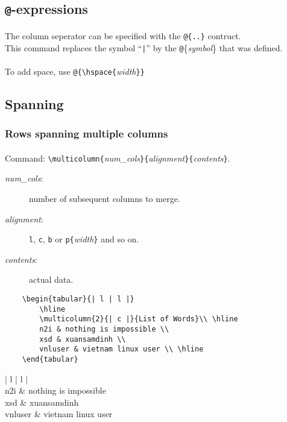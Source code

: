 \documentclass[11pt,a4paper]{article}
\begin{document}
\subsection{\texttt{@}-expressions}
\paragraph{}
The column seperator can be specified with the \verb|@{..}| contruct.\\
This command replaces the symbol ``\verb:|:'' by the \texttt{@}\{\emph{symbol}\} that was defined.

\paragraph{}
To add space, use \verb|@{\hspace{|\emph{width}\verb|}}|%



\subsection{Spanning}
\subsubsection{Rows spanning multiple columns}
\paragraph{}
Command: \verb|\multicolumn{|\emph{num\_cols}\verb|}{|\emph{alignment}\verb|}{|\emph{contents}\verb|}|.
\begin{description}
	\item[\emph{num\_cols}:] number of subsequent columns to merge.
	\item[\emph{alignment}:] \texttt{l}, \texttt{c}, \texttt{b} or \verb|p{|\emph{width}\verb|}| and so on.
	\item[\emph{contents}:] actual data.
\end{description}

\begin{verbatim}
	\begin{tabular}{| l | l |}
		\hline
		\multicolumn{2}{| c |}{List of Words}\\ \hline
		n2i & nothing is impossible \\
		xsd & xuansamdinh \\
		vnluser & vietnam linux user \\ \hline
	\end{tabular}
\end{verbatim}
\begin{table}[htbp]
	\centering
	\begin{tabular}{| l | l |}
		\hline
		 \\ \hline
		n2i & nothing is impossible \\
		xsd & xuansamdinh \\
		vnluser & vietnam linux user \\ \hline
	\end{tabular}
	\caption{Rows spanning multi cols}
	\label{rowsspan}
\end{table}
\end{document}
